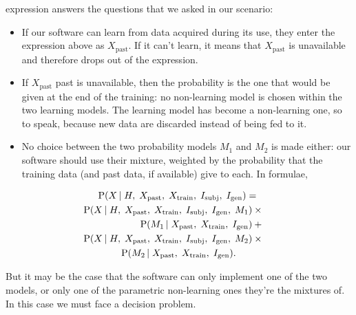 \documentclass[\ifafour a4paper,12pt,\else a5paper,10pt,\fi%
onecolumn,oneside,article,%
british%
]{memoir}
\makeatletter
\newcommand*{\widefbox}[1]{\fbox{\hspace{1em}#1\hspace{1em}}}
\theoremstyle{remark}
\theoremstyle{innote}
\def\sum{\DOTSI\sumop\slimits@}
\newcommand*{\de}{\partialup}%
\newcommand*{\p}{\mathrm{P}}%
\renewcommand*{\|}[1][]{\nonscript\,#1\vert\nonscript\;\mathopen{}}
\newcommand*{\tsum}{\mathop{\textstyle\sum}\nolimits}
\newcommand*{\Ma}{M_1}
\newcommand*{\Mb}{M_2}
\newcommand*{\Ki}{I_{\text{gen}}}
\newcommand*{\Ks}{I_{\text{subj}}}
\newcommand*{\Xt}{X_{\text{train}}}
\newcommand*{\Xp}{X_{\text{past}}}
\newcommand*{\yx}{X}
\newcommand*{\hh}{H}
\makeatother
\begin{document}
expression answers the questions that we asked in our scenario:
\begin{itemize}
\item If our software can learn from data acquired during its use, they
  enter the expression above as $\Xp$. If it can't learn, it means that
  $\Xp$ is unavailable and therefore drops out of the expression.
\item If $\Xp$ past is unavailable, then the probability is the one that
  would be given at the end of the training: no non-learning model is
  chosen within the two learning models. The learning model has become a
  non-learning one, so to speak, because new data are discarded instead of
  being fed to it.
\item No choice between the two probability models $\Ma$ and $\Mb$ is made
  either: our software should use their mixture, weighted by the
  probability that the training data (and past data, if available) give to
  each. In formulae,
\end{itemize}
\vspace{-\medskipamount}
  \begin{multline}
    \label{eq:software_uses_mixture}
    \p( \yx\| \hh,\; \Xp,\; \Xt,\; \Ks,\; \Ki) ={}\\
\shoveright{    \p( \yx\| \hh,\; \Xp,\; \Xt,\; \Ks,\; \Ki,\; \Ma) \times{}}\\ 
\shoveright{ \p(\Ma \| \Xp,\; \Xt,\; \Ki) +{}}\\ 
    \shoveright{\p( \yx\| \hh,\; \Xp,\; \Xt,\; \Ks,\; \Ki,\; \Mb) \times{}}\\
    \p(\Mb \| \Xp,\; \Xt,\; \Ki).
  \end{multline}

But it may be the case that the software can only implement one of the two
models, or only one of the parametric non-learning ones they're the
mixtures of. In this case we must face a decision problem.

\end{document}
